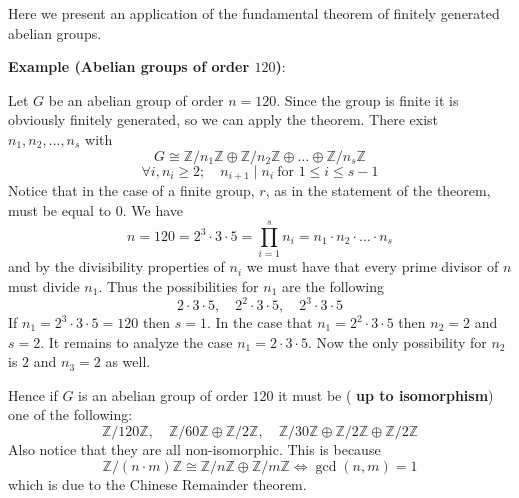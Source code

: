 \documentclass[12pt]{article}
\newcommand{\Ints}{\mathbb{Z}}
\begin{document}
Here we present an application of the fundamental theorem of
finitely generated abelian groups.

{\bf Example (Abelian groups of order $120$)}:

Let $G$ be an abelian group of order $n=120$. Since the group is
finite it is obviously finitely generated, so we can apply the
theorem. There exist $n_1,n_2,\ldots,n_s$ with
$$G\cong
\Ints/n_1\Ints\oplus\Ints/n_2\Ints\oplus\ldots\oplus\Ints/n_s\Ints$$
$$\forall i, n_i\geq 2;\quad n_{i+1}\mid n_i\ \text{for }
1\leq i\leq s-1$$ Notice that in the case of a finite group, $r$,
as in the statement of the theorem, must be equal to $0$. We have
$$n=120=2^3\cdot3\cdot5=\prod_{i=1}^s n_i=n_1\cdot n_2\cdot \ldots \cdot n_s$$
and by the divisibility properties of $n_i$ we must have that
every prime divisor of $n$ must divide $n_1$. Thus the
possibilities for $n_1$ are the following
$$2\cdot 3\cdot 5,\quad 2^2\cdot 3 \cdot 5,\quad 2^3\cdot 3\cdot 5$$
If $n_1=2^3\cdot 3\cdot 5=120$ then $s=1$. In the case that
$n_1=2^2\cdot 3 \cdot 5$ then $n_2=2$ and $s=2$. It remains to
analyze the case $n_1=2\cdot 3 \cdot 5$. Now the only possibility for
$n_2$ is $2$ and $n_3=2$ as well.

Hence if $G$ is an abelian group of order $120$ it must be ({\bf
up to isomorphism}) one of the following:
$$\Ints/120\Ints,\quad \Ints/60\Ints\oplus \Ints/2\Ints,\quad
\Ints/30\Ints\oplus\Ints/2\Ints\oplus\Ints/2\Ints$$ Also notice
that they are all non-isomorphic. This is because
$$\Ints/(n\cdot m)\Ints \cong \Ints/n\Ints\oplus \Ints/m\Ints
\Leftrightarrow \operatorname{gcd}(n,m)=1$$ which is due to the
Chinese Remainder theorem.
\end{document}
